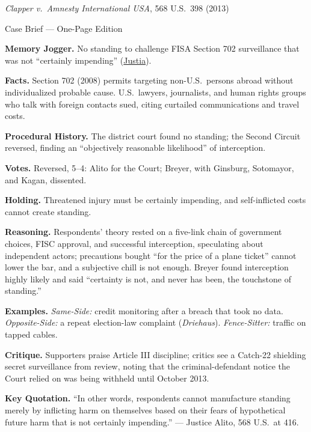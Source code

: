 \documentclass[12pt]{article}
\begin{document}
\begin{center}
{\Large \textit{Clapper v.\ Amnesty International USA}, 568 U.S.\ 398 (2013)\par}
\vspace{0.3em}
{\normalsize Case Brief --- One-Page Edition\par}
\end{center}

\textbf{Memory Jogger.} No standing to challenge FISA Section 702 surveillance that was not ``certainly impending'' (\href{https://supreme.justia.com/cases/federal/us/568/398/}{Justia}).

\textbf{Facts.} Section 702 (2008) permits targeting non-U.S.\ persons abroad without individualized probable cause. U.S.\ lawyers, journalists, and human rights groups who talk with foreign contacts sued, citing curtailed communications and travel costs.

\textbf{Procedural History.} The district court found no standing; the Second Circuit reversed, finding an ``objectively reasonable likelihood'' of interception.

\textbf{Votes.} Reversed, 5--4: Alito for the Court; Breyer, with Ginsburg, Sotomayor, and Kagan, dissented.

\textbf{Holding.} Threatened injury must be certainly impending, and self-inflicted costs cannot create standing.

\textbf{Reasoning.} Respondents' theory rested on a five-link chain of government choices, FISC approval, and successful interception, speculating about independent actors; precautions bought ``for the price of a plane ticket'' cannot lower the bar, and a subjective chill is not enough. Breyer found interception highly likely and said ``certainty is not, and never has been, the touchstone of standing.''

\textbf{Examples.} \emph{Same-Side:} credit monitoring after a breach that took no data. \emph{Opposite-Side:} a repeat election-law complaint (\textit{Driehaus}). \emph{Fence-Sitter:} traffic on tapped cables.

\textbf{Critique.} Supporters praise Article III discipline; critics see a Catch-22 shielding secret surveillance from review, noting that the criminal-defendant notice the Court relied on was being withheld until October 2013.

\textbf{Key Quotation.} ``In other words, respondents cannot manufacture standing merely by inflicting harm on themselves based on their fears of hypothetical future harm that is not certainly impending.'' --- Justice Alito, 568 U.S.\ at 416.
\end{document}
